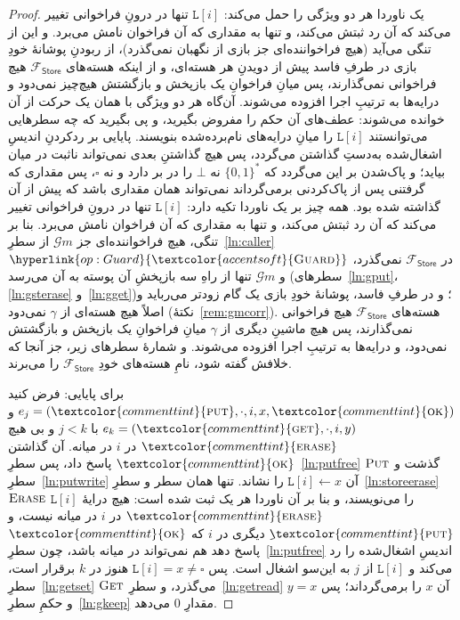 \documentclass[10pt,oneside,openany]{book}
\newcommand{\op}[1]{\textnormal{\textsc{#1}}}
\newcommand{\opl}[1]{\hyperlink{op:#1}{\textcolor{accentsoft}{\op{#1}}}}
\newcommand{\atom}[1]{\textcolor{commenttint}{\op{#1}}}
\newcommand{\ok}{\atom{ok}}
\newcommand{\Gm}{\mathcal{G}m}
\newcommand{\Fstore}{\mathcal{F}_{\mathsf{Store}}}
\newcommand{\unset}{\square}
\newcommand{\none}{\bot}
\newcommand{\V}[1]{\mathtt{#1}}
\newcommand{\bits}{\{0,1\}^*}
\theoremstyle{accentdef}
\theoremstyle{accentplain}
\begin{document}
\begin{proof}
یک ناوردا هر دو ویژگی را حمل می‌کند: $\V{L}[i]$ تنها در درونِ فراخوانی تغییر
می‌کند که آن رد ثبتش می‌کند، و تنها به مقداری که آن فراخوان نامش می‌برد. و
این از تنگی می‌آید (هیچ فراخواننده‌ای جز بازی از نگهبان نمی‌گذرد)، از
ربودنِ پوشانهٔ خودِ بازی در طرفِ فاسد پیش از دویدنِ هر هسته‌ای، و از اینکه
هسته‌های $\Fstore$ هیچ فراخوانی نمی‌گذارند، پس میانِ فراخوانِ یک بازپخش و
بازگشتش هیچ‌چیز نمی‌دود و درایه‌ها به ترتیبِ اجرا افزوده می‌شوند. آن‌گاه هر
دو ویژگی با همان یک حرکت از آن خوانده می‌شوند: عطف‌های آن حکم را مفروض
بگیرید، و پی بگیرید که چه سطرهایی می‌توانستند $\V{L}[i]$ را میانِ درایه‌های
نام‌برده‌شده بنویسند. پایایی بر ردکردنِ اندیسِ اشغال‌شده به‌دستِ گذاشتن
می‌گردد، پس هیچ گذاشتنِ بعدی نمی‌تواند ناثبت در میان بیاید؛ و پاک‌شدن بر
این می‌گردد که $\bits$ نه $\none$ را در بر دارد و نه $\unset$، پس مقداری که
گرفتنی پس از پاک‌کردنی برمی‌گرداند نمی‌تواند همان مقداری باشد که پیش از آن
گذاشته شده بود.
همه چیز بر یک ناوردا تکیه دارد: $\V{L}[i]$ تنها در درونِ فراخوانی تغییر
می‌کند که آن رد ثبتش می‌کند، و تنها به مقداری که آن فراخوان نامش می‌برد. بنا
بر تنگی، هیچ فراخواننده‌ای جز $\Gm$ از سطرِ~\ref{ln:caller}ِ
$\opl{Guard}$ در $\Fstore$ نمی‌گذرد، و $\Gm$ تنها از راهِ سه بازپخشِ آن
پوسته به آن می‌رسد (سطرهای~\ref{ln:gput}، \ref{ln:gsterase}
و~\ref{ln:gget})؛ و در طرفِ فاسد، پوشانهٔ خودِ بازی یک گام زودتر می‌رباید و
اصلاً هیچ هسته‌ای از $\gamma$ نمی‌دود (نکتهٔ~\ref{rem:gmcorr}). هسته‌های
$\Fstore$ هیچ فراخوانی نمی‌گذارند، پس هیچ ماشینِ دیگری از $\gamma$ میانِ
فراخوانِ یک بازپخش و بازگشتش نمی‌دود، و درایه‌ها به ترتیبِ اجرا افزوده
می‌شوند. و شمارهٔ سطرهای زیر، جز آنجا که خلافش گفته شود، نامِ هسته‌های خودِ
$\Fstore$ را می‌برند.

برای پایایی: فرض کنید $e_j = (\atom{put},\cdot,i,x,\ok)$ و $e_k =
(\atom{get},\cdot,i,y)$ با $j < k$ و بی هیچ $\atom{erase}$ در $i$ در میانه.
آن گذاشتن $\ok$ پاسخ داد، پس سطرِ~\ref{ln:putfree}ِ $\op{Put}$ گذشت و
سطرِ~\ref{ln:putwrite}ِ آن $\V{L}[i] \gets x$ را نشاند. تنها همان سطر و
سطرِ~\ref{ln:storeerase}ِ $\op{Erase}$ $\V{L}[i]$ را می‌نویسند، و بنا بر آن
ناوردا هر یک ثبت شده است: هیچ درایهٔ $\atom{erase}$ در $i$ در میانه نیست، و
$\atom{put}$ِ دیگری در $i$ که $\ok$ پاسخ دهد هم نمی‌تواند در میانه باشد،
چون سطرِ~\ref{ln:putfree} اندیسِ اشغال‌شده را رد می‌کند و $\V{L}[i]$ از $j$
به این‌سو اشغال است. پس $\V{L}[i] = x \neq \unset$ هنوز در $k$ برقرار است،
سطرِ~\ref{ln:getset}ِ $\op{Get}$ می‌گذرد، و سطرِ~\ref{ln:getread}ِ آن $x$
را برمی‌گرداند؛ پس $y = x$ و حکمِ سطرِ~\ref{ln:gkeep} مقدارِ $0$ می‌دهد.


\end{proof}
\end{document}
